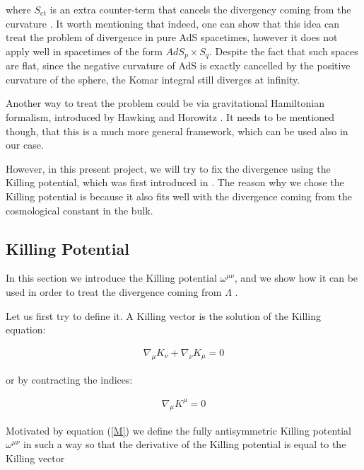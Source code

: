 \documentclass[a4paper,notitlepage]{report}
\begin{document}
\vspace{0.5 em}
where $S_{\text{ct}}$ is an extra counter-term that cancels the divergency coming from the curvature \cite{brown1993quasilocal,balasubramanian1999stress}. It worth mentioning that indeed, one can show that this idea can treat the problem of divergence in pure AdS spacetimes, however it does not apply well in spacetimes of the form $AdS_p \times S_q$. Despite the fact that such spaces are flat, since the negative curvature of AdS is exactly cancelled by the positive curvature of the sphere, the Komar integral still diverges at infinity. 

Another way to treat the problem could be via gravitational Hamiltonian formalism, introduced by Hawking and Horowitz \cite{hawking1996gravitational}. It needs to be mentioned though, that this is a much more general framework, which can be used also in our case.

However, in this present project, we will try to fix the divergence using the Killing potential, which was first introduced in \cite{bazanski1990gauss,kastor2008komar}. The reason why we chose the Killing potential is because it also fits well with the divergence coming from the cosmological constant in the bulk.

\subsection{Killing Potential}

In this section we introduce the Killing potential $\omega^{\mu\nu}$, and we show how it can be used in order to treat the divergence coming from $\Lambda$ \cite{kastor2008komar,kastor2009enthalpy}.

Let us first try to define it. A Killing vector is the solution of the Killing equation:

\begin{align} \label{N}
\nabla_{\mu} K_{\nu} + \nabla_{\nu} K_{\mu} = 0
\end{align}

\vspace{0.5em}
or by contracting the indices:

\begin{align} \label{M}
\nabla_{\mu} K^{\mu} = 0
\end{align}

\vspace{0.5em}
Motivated by equation (\ref{M}) we define the fully antisymmetric Killing potential $\omega^{\mu\nu}$ in such a way so that the derivative of the Killing potential is equal to the Killing vector
\end{document}
